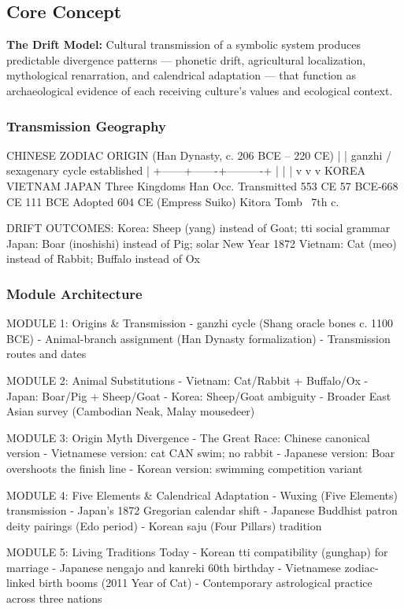 \documentclass[11pt,letterpaper]{article}
\begin{document}
\subsection{Core Concept}

\textbf{The Drift Model:} Cultural transmission of a symbolic system produces predictable divergence patterns --- phonetic drift, agricultural localization, mythological renarration, and calendrical adaptation --- that function as archaeological evidence of each receiving culture's values and ecological context.

\subsubsection{Transmission Geography}

\begin{asciibox}
CHINESE ZODIAC ORIGIN (Han Dynasty, c. 206 BCE -- 220 CE)
            |
            | ganzhi / sexagenary cycle established
            |
     +------+-------+----------+
     |              |          |
     v              v          v
KOREA            VIETNAM    JAPAN
Three Kingdoms   Han Occ.   Transmitted 553 CE
57 BCE-668 CE    111 BCE    Adopted 604 CE (Empress Suiko)
                            Kitora Tomb ~7th c.

DRIFT OUTCOMES:
  Korea:   Sheep (yang) instead of Goat; tti social grammar
  Japan:   Boar (inoshishi) instead of Pig; solar New Year 1872
  Vietnam: Cat (meo) instead of Rabbit; Buffalo instead of Ox
\end{asciibox}

\subsubsection{Module Architecture}

\begin{asciibox}
MODULE 1: Origins & Transmission
  - ganzhi cycle (Shang oracle bones c. 1100 BCE)
  - Animal-branch assignment (Han Dynasty formalization)
  - Transmission routes and dates

MODULE 2: Animal Substitutions
  - Vietnam: Cat/Rabbit + Buffalo/Ox
  - Japan: Boar/Pig + Sheep/Goat
  - Korea: Sheep/Goat ambiguity
  - Broader East Asian survey (Cambodian Neak, Malay mousedeer)

MODULE 3: Origin Myth Divergence
  - The Great Race: Chinese canonical version
  - Vietnamese version: cat CAN swim; no rabbit
  - Japanese version: Boar overshoots the finish line
  - Korean version: swimming competition variant

MODULE 4: Five Elements & Calendrical Adaptation
  - Wuxing (Five Elements) transmission
  - Japan's 1872 Gregorian calendar shift
  - Japanese Buddhist patron deity pairings (Edo period)
  - Korean saju (Four Pillars) tradition

MODULE 5: Living Traditions Today
  - Korean tti compatibility (gunghap) for marriage
  - Japanese nengajo and kanreki 60th birthday
  - Vietnamese zodiac-linked birth booms (2011 Year of Cat)
  - Contemporary astrological practice across three nations
\end{asciibox}
\end{document}
